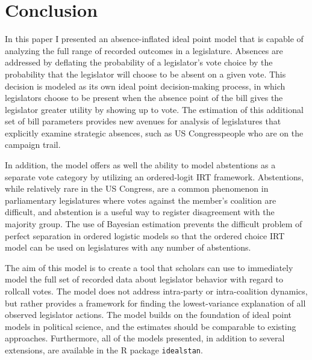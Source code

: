 	\section{Conclusion}
	
	In this paper I presented an absence-inflated ideal point model that is capable of analyzing the full range of recorded outcomes in a legislature. Absences are addressed by deflating the probability of a legislator's vote choice by the probability that the legislator will choose to be absent on a given vote. This decision is modeled as its own ideal point decision-making process, in which legislators choose to be present when the absence point of the bill gives the legislator greater utility by showing up to vote. The estimation of this additional set of bill parameters provides new avenues for analysis of legislatures that explicitly examine strategic absences, such as US Congresspeople who are on the campaign trail.
	
	In addition, the model offers as well the ability to model abstentions as a separate vote category by utilizing an ordered-logit IRT framework. Abstentions, while relatively rare in the US Congress, are a common phenomenon in parliamentary legislatures where votes against the member's coalition are difficult, and abstention is a useful way to register disagreement with the majority group. The use of Bayesian estimation prevents the difficult problem of perfect separation in ordered logistic models so that the ordered choice IRT model can be used on legislatures with any number of abstentions.
	
	The aim of this model is to create a tool that scholars can use to immediately model the full set of recorded data about legislator behavior with regard to rollcall votes. The model does not address intra-party or intra-coalition dynamics, but rather provides a framework for finding the lowest-variance explanation of all observed legislator actions. The model builds on the foundation of ideal point models in political science, and the estimates should be comparable to existing approaches. Furthermore, all of the models presented, in addition to several extensions, are available in the R package \texttt{idealstan}.
	
	\printbibliography
	
